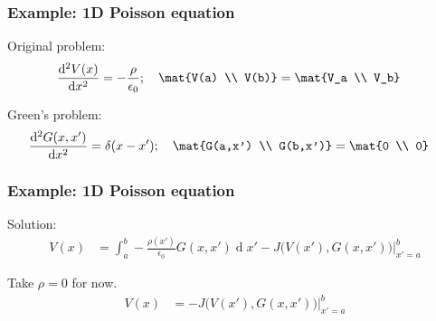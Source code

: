 \documentclass[12 pt, compress, handout, intlimits]{beamer}
\renewcommand{\d}{\operatorname{d}\!}
\begin{document}
\begin{frame}[fragile]
    \frametitle{Example: 1D Poisson equation}

    Original problem:
    \begin{align*}
        \frac{\d^2 V(x)}{\d x^2} &= - \frac{\rho}{\epsilon_0}; \quad \mat{V(a) \\ V(b)} = \mat{V_a \\ V_b}
    \end{align*}
    
    Green's problem:
    \begin{align*}
        \frac{\d^2 G(x,x')}{\d x^2} &= \delta(x - x'); \quad \mat{G(a,x') \\ G(b,x')} = \mat{0 \\ 0}
    \end{align*}

\end{frame}



\begin{frame}[fragile]
    \frametitle{Example: 1D Poisson equation}

    Solution:
    \begin{align*}
        V(x) &= \int_{a}^{b} - \frac{\rho(x')}{\epsilon_0} G(x,x') \d x' - J\big( V(x'), G(x,x') \big) \Big|_{x'=a}^b
    \end{align*}

    Take $ \rho = 0 $ for now.
    \begin{align*}
        V(x) &= - J\big( V(x'), G(x,x') \big) \Big|_{x'=a}^b
    \end{align*}

\end{frame}

\note{}
\end{document}
